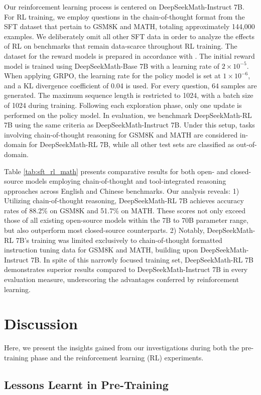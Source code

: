 \begin{itemize}[topsep=0pt]
\begin{itemize}[topsep=0pt]
Our reinforcement learning process is centered on DeepSeekMath-Instruct 7B. For RL training, we employ questions in the chain-of-thought format from the SFT dataset that pertain to GSM8K and MATH, totaling approximately 144,000 examples. We deliberately omit all other SFT data in order to analyze the effects of RL on benchmarks that remain data-scarce throughout RL training. The dataset for the reward models is prepared in accordance with \citep{wang2023math}. The initial reward model is trained using DeepSeekMath-Base 7B with a learning rate of $2 \times 10^{-5}$. When applying GRPO, the learning rate for the policy model is set at $1 \times 10^{-6}$, and a KL divergence coefficient of 0.04 is used. For every question, $64$ samples are generated. The maximum sequence length is restricted to 1024, with a batch size of 1024 during training. Following each exploration phase, only one update is performed on the policy model. In evaluation, we benchmark DeepSeekMath-RL 7B using the same criteria as DeepSeekMath-Instruct 7B. Under this setup, tasks involving chain-of-thought reasoning for GSM8K and MATH are considered in-domain for DeepSeekMath-RL 7B, while all other test sets are classified as out-of-domain.

Table \ref{tab:sft_rl_math} presents comparative results for both open- and closed-source models employing chain-of-thought and tool-integrated reasoning approaches across English and Chinese benchmarks. Our analysis reveals: 1) Utilizing chain-of-thought reasoning, DeepSeekMath-RL 7B achieves accuracy rates of 88.2\% on GSM8K and 51.7\% on MATH. These scores not only exceed those of all existing open-source models within the 7B to 70B parameter range, but also outperform most closed-source counterparts. 2) Notably, DeepSeekMath-RL 7B’s training was limited exclusively to chain-of-thought formatted instruction tuning data for GSM8K and MATH, building upon DeepSeekMath-Instruct 7B. In spite of this narrowly focused training set, DeepSeekMath-RL 7B demonstrates superior results compared to DeepSeekMath-Instruct 7B in every evaluation measure, underscoring the advantages conferred by reinforcement learning.

\section{Discussion}
Here, we present the insights gained from our investigations during both the pre-training phase and the reinforcement learning (RL) experiments.

\subsection{Lessons Learnt in Pre-Training}


\end{itemize}
\end{itemize}
